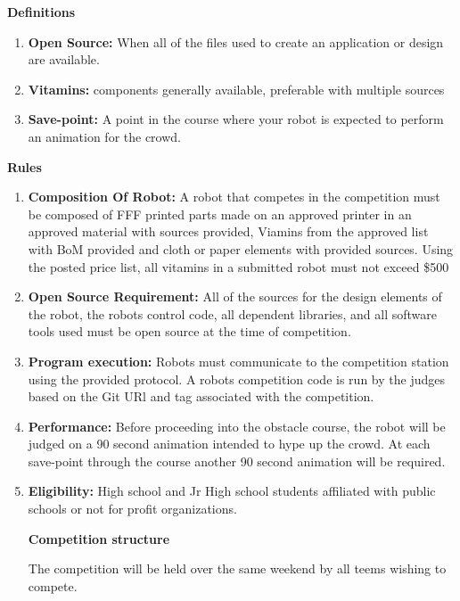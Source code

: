 \documentclass{article}
\begin{document}
 \pagebreak
 
{\huge \textbf{Definitions}}
\begin{enumerate}
	\item \textbf{Open Source:} When all of the files used to create an application or design are available.
	\item \textbf{Vitamins:} components generally available, preferable with multiple sources
	\item \textbf{Save-point:} A point in the course where your robot is expected to perform an animation for the crowd.  
\end{enumerate}

  \pagebreak
{\huge \textbf{Rules}}

\begin{enumerate}
	
\item \textbf{Composition Of Robot:} A robot that competes in the competition must be composed of FFF printed parts made on an approved printer in an approved material with sources provided, Viamins from the approved list with BoM provided and cloth or paper elements with provided sources. Using the posted price list, all vitamins in a submitted robot must not exceed \$500

\item \textbf{Open Source Requirement:} All of the sources for the design elements of the robot, the robots control code, all dependent libraries, and all software tools used must be open source at the time of competition. 

\item \textbf{Program execution:} Robots must communicate to the competition station using the provided protocol. A robots competition code is run by the judges based on the Git URl and tag associated with the competition. 


\item \textbf{Performance:} Before proceeding into the obstacle course, the robot will be judged on a 90 second animation intended to hype up the crowd. At each save-point through the course another 90 second animation will be required. 

\item \textbf{Eligibility:} High school and Jr High school students affiliated with public schools or not for profit organizations. 

 \pagebreak

{\huge \textbf{Competition structure}}

The competition will be held over the same weekend by all teems wishing to compete. 


\end{enumerate}
\end{document}
